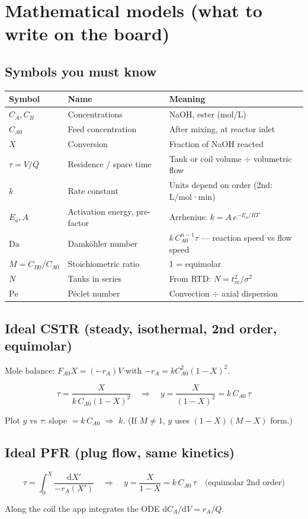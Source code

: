 \documentclass[11pt,a4paper]{article}
\begin{document}
\section{Mathematical models (what to write on the board)}

\subsection{Symbols you must know}
\begin{tabularx}{\textwidth}{@{}ll L@{}}
\toprule
Symbol & Name & Meaning \\
\midrule
\(C_A, C_B\) & Concentrations & NaOH, ester (mol/L) \\
\(C_{A0}\) & Feed concentration & After mixing, at reactor inlet \\
\(X\) & Conversion & Fraction of NaOH reacted \\
\(\tau = V/Q\) & Residence / space time & Tank or coil volume \(\div\) volumetric flow \\
\(k\) & Rate constant & Units depend on order (2nd: L/mol·min) \\
\(E_a, A\) & Activation energy, pre-factor & Arrhenius: \(k = A\,e^{-E_a/RT}\) \\
\(\mathrm{Da}\) & Damköhler number & \(k\,C_{A0}^{n-1}\tau\) --- reaction speed vs flow speed \\
\(M = C_{B0}/C_{A0}\) & Stoichiometric ratio & 1 = equimolar \\
\(N\) & Tanks in series & From RTD: \(N = t_m^2/\sigma^2\) \\
\(\mathrm{Pe}\) & Péclet number & Convection \(\div\) axial dispersion \\
\bottomrule
\end{tabularx}

\subsection{Ideal CSTR (steady, isothermal, 2nd order, equimolar)}
Mole balance: \(F_{A0}X = (-r_A)V\) with \(-r_A = k C_{A0}^2 (1-X)^2\).
\begin{eqbox}
\[
\tau = \frac{X}{k\,C_{A0}(1-X)^2}
\quad\Rightarrow\quad
y = \frac{X}{(1-X)^2} = k\,C_{A0}\,\tau
\]
\end{eqbox}
Plot \(y\) vs \(\tau\): slope \(= k\,C_{A0}\) \(\Rightarrow\) \(k\). (If \(M\neq 1\), \(y\) uses \((1-X)(M-X)\) form.)

\subsection{Ideal PFR (plug flow, same kinetics)}
\begin{eqbox}
\[
\tau = \int_0^X \frac{\mathrm{d}X'}{-r_A(X')}
\quad\Rightarrow\quad
y = \frac{X}{1-X} = k\,C_{A0}\,\tau
\quad\text{(equimolar 2nd order)}
\]
\end{eqbox}
Along the coil the app integrates the ODE \(\mathrm{d}C_A/\mathrm{d}V = r_A/Q\).
\end{document}
